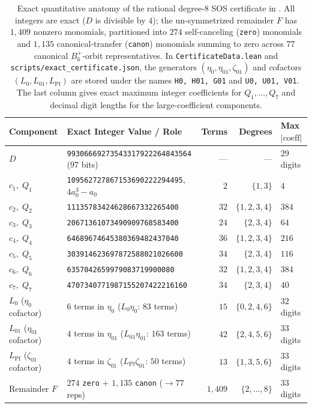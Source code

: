 \documentclass[11pt,a4paper]{article}
\theoremstyle{plain}
\theoremstyle{definition}
\theoremstyle{remark}
\newcommand{\Bplus}{B_6^+}
\newcommand{\code}[1]{\texttt{\small #1}}
\begin{document}
\begin{table}[t]
  \centering
  \caption{Exact quantitative anatomy of the rational degree-$8$ SOS certificate in . All integers are exact ($D$ is divisible by $4$); the un-symmetrized remainder $F$ has $1{,}409$ nonzero monomials, partitioned into $274$ self-canceling (\code{zero}) monomials and $1{,}135$ canonical-transfer (\code{canon}) monomials summing to zero across $77$ canonical $\Bplus$-orbit representatives. In \code{CertificateData.lean} and \code{scripts/exact\_certificate.json}, the generators $(\eta_0, \eta_{01}, \zeta_{01})$ and cofactors $(L_0, L_{01}, L_{\mathrm{Pf}})$ are stored under the names \code{H0, H01, G01} and \code{U0, U01, V01}. The last column gives exact maximum integer coefficients for $Q_1,\dots,Q_7$ and decimal digit lengths for the large-coefficient components.}
  \label{tab:cert-anatomy}
  \footnotesize
  \begin{tabular}{@{}llrrl@{}}
    \toprule
    Component & Exact Integer Value / Role & Terms & Degrees & Max $\lvert\text{coeff}\rvert$ \\
    \midrule
    $D$ & \texttt{99306669273543317922264843564} ($97$ bits) & --- & --- & $29$ digits \\
    \midrule
    $c_1,\; Q_1$ & \texttt{109562727867153690222294495},\; $4a_0^3 - a_0$ & $2$ & $\{1,3\}$ & $4$ \\
    $c_2,\; Q_2$ & \texttt{11135783424628667332265400} & $32$ & $\{1,2,3,4\}$ & $384$ \\
    $c_3,\; Q_3$ & \texttt{20671361073490909768583400} & $24$ & $\{2,3,4\}$ & $64$ \\
    $c_4,\; Q_4$ & \texttt{64689674645380369482437040} & $36$ & $\{1,2,3,4\}$ & $216$ \\
    $c_5,\; Q_5$ & \texttt{303914623697872588021026600} & $34$ & $\{2,3,4\}$ & $116$ \\
    $c_6,\; Q_6$ & \texttt{6357042659979083719900080} & $32$ & $\{1,2,3,4\}$ & $384$ \\
    $c_7,\; Q_7$ & \texttt{4707340771987155207422216160} & $34$ & $\{2,3,4\}$ & $40$ \\
    \midrule
    $L_0$ ($\eta_0$ cofactor) & $6$ terms in $\eta_0$ ($L_0 \eta_0$: $83$ terms) & $15$ & $\{0,2,4,6\}$ & $32$ digits \\
    $L_{01}$ ($\eta_{01}$ cofactor) & $4$ terms in $\eta_{01}$ ($L_{01} \eta_{01}$: $163$ terms) & $42$ & $\{2,4,5,6\}$ & $33$ digits \\
    $L_{\mathrm{Pf}}$ ($\zeta_{01}$ cofactor) & $4$ terms in $\zeta_{01}$ ($L_{\mathrm{Pf}} \zeta_{01}$: $50$ terms) & $13$ & $\{1,3,5,6\}$ & $33$ digits \\
    \midrule
    Remainder $F$ & $274$ \code{zero} $+$ $1{,}135$ \code{canon} ($\to 77$ reps) & $1{,}409$ & $\{2,\dots,8\}$ & $33$ digits \\
    \bottomrule
  \end{tabular}
\end{table}
\end{document}
